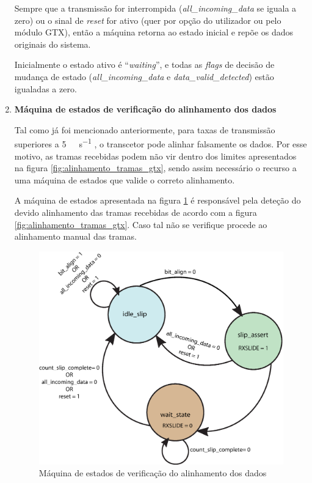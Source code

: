 \documentclass[11pt,a4paper]{article}
\begin{document}
\begin{enumerate}
		Sempre que a transmissão for interrompida (\textit{all\_incoming\_data} se iguala a zero) ou o sinal de \textit{reset} for ativo (quer por opção do utilizador ou pelo módulo GTX), então a máquina retorna ao estado inicial e repõe os dados originais do sistema. 
		
		Inicialmente o estado ativo é ``\textit{waiting}'', e todas as \textit{flags} de decisão de mudança de estado (\textit{all\_incoming\_data} e \textit{data\_valid\_detected}) estão igualadas a zero.
		
		
		\item \textbf{Máquina de estados de verificação do alinhamento dos dados}
		
		Tal como já foi mencionado anteriormente, para taxas de transmissão superiores a \SI{5}{\giga\bit\per\second} , o transcetor pode alinhar falsamente os dados. Por esse motivo, as tramas recebidas podem não vir dentro dos limites apresentados na figura \ref{fig:alinhamento_tramas_gtx}, sendo assim necessário o recurso a uma máquina de estados que valide o correto alinhamento.
		
		A máquina de estados apresentada na figura \ref{fig:fsm3} é responsável pela deteção do devido alinhamento das tramas recebidas de acordo com a figura \ref{fig:alinhamento_tramas_gtx}. Caso tal não se verifique procede ao alinhamento manual das tramas.
		
		\begin{figure}[h!]
			\begin{center}
				\leavevmode
				\includegraphics[width=1.0\textwidth]{fsm_bit_align}
				\caption[Máquina de estados de verificação do alinhamento dos dados]{Máquina de estados de verificação do alinhamento dos dados}
				\label{fig:fsm3}
			\end{center}
		\end{figure}
		

\end{enumerate}
\end{document}
